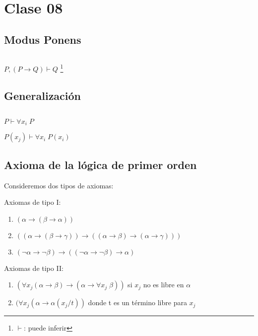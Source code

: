 \section{Clase 08}

\subsection{Modus Ponens}
$\;$

$P, (P \rightarrow Q) \vdash Q$ \footnote{$\vdash$: puede inferir}

\subsection{Generalizaci\'on}
$\;$

$P \vdash \forall x_i \; P$

$P(x_j) \vdash \forall x_i \; P(x_i)$

\subsection{Axioma de la l\'ogica de primer orden}

Consideremos dos tipos de axiomas:

Axiomas de tipo I:

\begin{enumerate}
	\item $(\alpha \rightarrow (\beta \rightarrow \alpha))$
	\item $((\alpha \rightarrow (\beta \rightarrow \gamma))	\rightarrow ((\alpha \rightarrow \beta)\rightarrow(\alpha \rightarrow \gamma)))$
	\item $(\neg \alpha \rightarrow \neg \beta) \rightarrow ((\neg \alpha \rightarrow \neg \beta) \rightarrow \alpha)$
\end{enumerate}

Axiomas de tipo II: 

\begin{enumerate}
	\item $(\forall x_j (\alpha \rightarrow \beta) \rightarrow (\alpha \rightarrow \forall x_j \; \beta))$ si $x_j$ no es libre en $\alpha$
	\item $(\forall x_j (\alpha \rightarrow \alpha(x_j / t))$ donde t es un t\'ermino libre para $x_j$
\end{enumerate}

